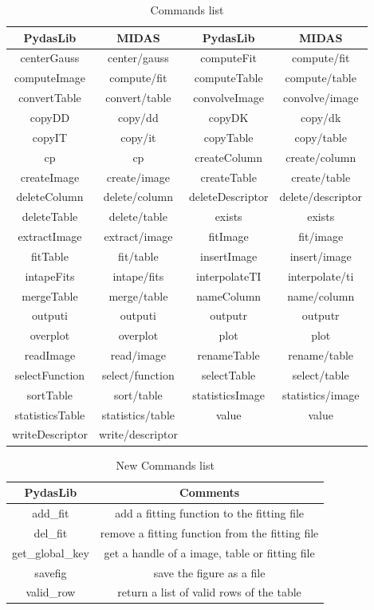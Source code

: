 \begin{table}[!hb]
\begin{center}
\caption{Commands list}
\label{commands}
\begin{tabular}{cc||cc}
\hline
 PydasLib & MIDAS &PydasLib & MIDAS\\
\hline
\hline
 centerGauss & center/gauss &
computeFit & compute/fit \\
computeImage & compute/fit &
computeTable & compute/table\\
convertTable & convert/table  &
convolveImage & convolve/image\\
copyDD & copy/dd &
copyDK & copy/dk\\
copyIT & copy/it &
copyTable & copy/table\\
cp & cp &
createColumn & create/column\\
createImage & create/image &
createTable & create/table\\
deleteColumn & delete/column &
deleteDescriptor & delete/descriptor\\
deleteTable & delete/table &
exists & exists \\
extractImage & extract/image &
fitImage & fit/image\\
fitTable & fit/table &
insertImage & insert/image\\
intapeFits & intape/fits &
interpolateTI & interpolate/ti\\
mergeTable & merge/table &
nameColumn & name/column\\
outputi & outputi &
outputr & outputr\\
overplot & overplot &
plot & plot\\
readImage & read/image &
renameTable & rename/table\\
selectFunction & select/function &
selectTable & select/table\\
sortTable & sort/table &
statisticsImage & statistics/image\\
statisticsTable & statistics/table &
value &value \\
writeDescriptor & write/descriptor\\
\hline 
\hline
\end{tabular}
\end{center}
\end{table}

\begin{table}[!hb]
\begin{center}
\caption{New Commands list}
\label{new-commands}
\begin{tabular}{c|c}
\hline
 PydasLib & Comments\\
\hline 
\hline
 add\_fit  & add a fitting function to the fitting file\\
del\_fit & remove a fitting function from the fitting file \\
get\_global\_key & get a handle of a image, table or fitting file\\
savefig &  save the figure as a file\\
valid\_row & return a list of valid rows of the table\\
\hline
\hline
\end{tabular}
\end{center}
\end{table}

